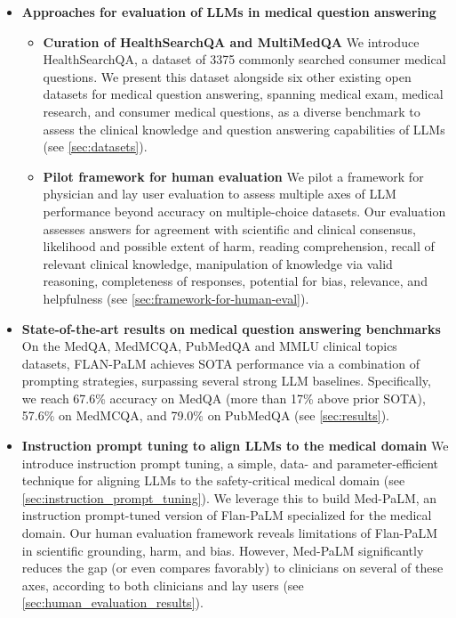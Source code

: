 \begin{itemize}[leftmargin=1.5em,rightmargin=0em]

\item \textbf{Approaches for evaluation of LLMs in medical question answering}

\begin{itemize}
    \item[-] \textbf{Curation of HealthSearchQA and MultiMedQA} We introduce HealthSearchQA, a dataset of 3375 commonly searched consumer medical questions. We present this dataset alongside six other existing open datasets for medical question answering, spanning medical exam, medical research, and consumer medical questions, as a diverse benchmark to assess the clinical knowledge and question answering capabilities of LLMs (see \ref{sec:datasets}).
    \item[-] \textbf{Pilot framework for human evaluation} We pilot a framework for physician and lay user evaluation to assess multiple axes of LLM performance beyond accuracy on multiple-choice datasets. Our evaluation assesses answers for agreement with scientific and clinical consensus, likelihood and possible extent of harm, reading comprehension, recall of relevant clinical knowledge, manipulation of knowledge via valid reasoning, completeness of responses, potential for bias, relevance, and helpfulness (see \ref{sec:framework-for-human-eval}).

\end{itemize}

\item \textbf{State-of-the-art results on medical question answering benchmarks} On the MedQA, MedMCQA, PubMedQA and MMLU clinical topics datasets, FLAN-PaLM achieves SOTA performance via a combination of prompting strategies, surpassing several strong LLM baselines. Specifically, we reach 67.6\% accuracy on MedQA (more than 17\% above prior SOTA), 57.6\% on MedMCQA, and 79.0\% on PubMedQA (see \ref{sec:results}).

\item \textbf{Instruction prompt tuning to align LLMs to the medical domain} We introduce instruction prompt tuning, a simple, data- and parameter-efficient technique for aligning LLMs to the safety-critical medical domain (see \ref{sec:instruction_prompt_tuning}). We leverage this to build Med-PaLM, an instruction prompt-tuned version of Flan-PaLM specialized for the medical domain. Our human evaluation framework reveals limitations of Flan-PaLM in scientific grounding, harm, and bias. However, Med-PaLM significantly reduces the gap (or even compares favorably) to clinicians on several of these axes, according to both clinicians and lay users (see \ref{sec:human_evaluation_results}).


\end{itemize}
